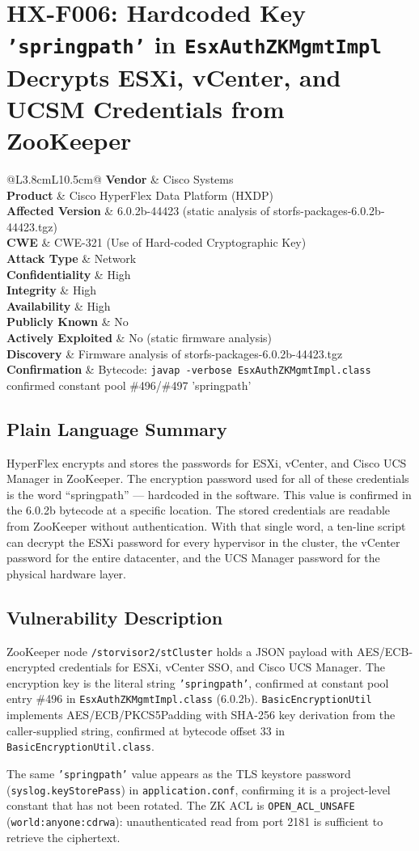 \documentclass[11pt,a4paper]{article}
\makeatletter
\newcommand{\findingmeta}[9]{%
\begin{tabular}{@{}L{3.8cm}L{10.5cm}@{}}
\textbf{Vendor}             & Cisco Systems \\
\textbf{Product}            & Cisco HyperFlex Data Platform (HXDP) \\
\textbf{Affected Version}   & 6.0.2b-44423 (static analysis of storfs-packages-6.0.2b-44423.tgz) \\
\textbf{CWE}                & #1 \\
\textbf{Attack Type}        & #2 \\
\textbf{Confidentiality}    & #3 \\
\textbf{Integrity}          & #4 \\
\textbf{Availability}       & #5 \\
\textbf{Publicly Known}     & #6 \\
\textbf{Actively Exploited} & #7 \\
\textbf{Discovery}          & #8 \\
\textbf{Confirmation}       & #9 \\
\end{tabular}%
}
\makeatother
\begin{document}
\bigskip

\section{HX-F006: Hardcoded Key \texttt{'springpath'} in \texttt{EsxAuthZKMgmtImpl} Decrypts ESXi, vCenter, and UCSM Credentials from ZooKeeper}

\findingmeta{CWE-321 (Use of Hard-coded Cryptographic Key)}{Network}{High}{High}{High}{No}{No (static firmware analysis)}{Firmware analysis of storfs-packages-6.0.2b-44423.tgz}{Bytecode: \texttt{javap -verbose EsxAuthZKMgmtImpl.class} confirmed constant pool \#496/\#497 'springpath'}

\subsection*{Plain Language Summary}

HyperFlex encrypts and stores the passwords for ESXi, vCenter, and Cisco UCS
Manager in ZooKeeper. The encryption password used for all of these credentials
is the word ``springpath'' --- hardcoded in the software. This value is confirmed
in the 6.0.2b bytecode at a specific location. The stored credentials are
readable from ZooKeeper without authentication. With that single word, a
ten-line script can decrypt the ESXi password for every hypervisor in the
cluster, the vCenter password for the entire datacenter, and the UCS Manager
password for the physical hardware layer.

\subsection*{Vulnerability Description}

ZooKeeper node \texttt{/storvisor2/stCluster} holds a JSON payload with
AES/ECB-encrypted credentials for ESXi, vCenter SSO, and Cisco UCS Manager.
The encryption key is the literal string \texttt{'springpath'}, confirmed at
constant pool entry \#496 in \texttt{EsxAuthZKMgmtImpl.class} (6.0.2b).
\texttt{BasicEncryptionUtil} implements AES/ECB/PKCS5Padding with SHA-256 key
derivation from the caller-supplied string, confirmed at bytecode offset 33 in
\texttt{BasicEncryptionUtil.class}.

The same \texttt{'springpath'} value appears as the TLS keystore password
(\texttt{syslog.keyStorePass}) in \texttt{application.conf}, confirming it is a
project-level constant that has not been rotated. The ZK ACL is
\texttt{OPEN\_ACL\_UNSAFE} (\texttt{world:anyone:cdrwa}): unauthenticated read
from port 2181 is sufficient to retrieve the ciphertext.
\end{document}
